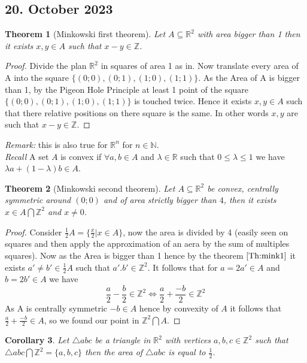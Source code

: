 \documentclass[a4paper,11pt,american]{article}
\newcommand{\N}{\mathbb{N}}
\newcommand{\R}{\mathbb{R}}
\newcommand{\Z}{\mathbb{Z}}
\theoremstyle{plain}
\newtheorem{theorem}{Theorem}
\newtheorem{corollary}[theorem]{Corollary}
\theoremstyle{definition}
\begin{document}
\subsection*{20. October 2023}
\begin{theorem}[Minkowski first theorem]\label{Th:mink1}
    Let $A\subseteq\R^2$ with area bigger than 1 then it exists $x,y\in A$ such that $x-y\in \Z$.
\end{theorem}
\begin{proof}
    Divide the plan $\R^2$ in squares of area 1 as in. Now translate every area of A into the square $\{(0;0), (0;1), (1;0),(1;1)\}$. As the Area of A is bigger than 1, by the Pigeon Hole Principle at least 1 point of the square $\{(0;0), (0;1), (1;0),(1;1)\}$ is touched twice. Hence it exists $x,y\in A$ such that there relative positions on there square is the same. In other words $x,y$ are such that $x-y\in \Z$.
\end{proof}
\emph{Remark:} this is also true for $\R^n$ for $n\in \N$.\\
\emph{Recall} A set $A$ is convex if $\forall a,b\in A$ and $\lambda\in \R$ such that $0\leq \lambda\leq1$ we have $\lambda a+(1-\lambda)b\in A$.
\begin{theorem}[Minkowski second theorem]\label{th:mink2}
    Let $A\subseteq \R^2$ be convex, centrally symmetric around $(0;0)$ and of area strictly bigger than $4$, then it exists $x\in A\bigcap \Z^2$ and $x\neq 0$.
\end{theorem}
\begin{proof}
    Consider $\frac{1}{2}A=\{\frac{x}{2}\vert x\in A\}$, now the area is divided by 4 (easily seen on squares and then apply the approximation of an aera by the sum of multiples squares). Now as the Area is bigger than 1 hence by the theorem $\eqref{Th:mink1}$ it exists $a'\neq b'\in \frac{1}{2}A$ such that $a'.b'\in\Z^2$. It follows that for $a=2a'\in A$ and $b=2b'\in A$ we have $$\frac{a}{2}-\frac{b}{2}\in \Z^2\iff \frac{a}{2}+\frac{-b}{2}\in \Z^2 $$ 
    As A is centrally symmetric $-b\in A$ hence by convexity of $A$ it follows that $\frac{a}{2}+\frac{-b}{2}\in A$, so we found our point in $\Z^2\bigcap A$.
\end{proof}
\begin{corollary} \label{cor Mink}
    Let $\bigtriangleup abc$ be a triangle in $\R^2$ with vertices $a,b,c\in \Z^2$ such that $\bigtriangleup abc\bigcap\Z^2=\{a,b,c\}$ then the area of $\bigtriangleup abc$ is equal to $\frac{1}{2}$.
\end{corollary}
\end{document}

